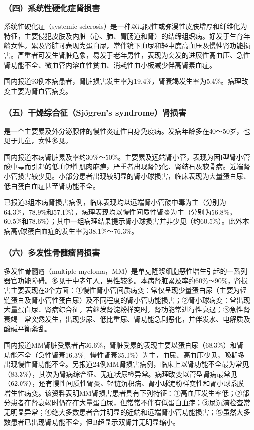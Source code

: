 \subsubsection{（四）系统性硬化症肾损害}

系统性硬化症（systemic
sclerosis）是一种以局限性或弥漫性皮肤增厚和纤维化为特征，主要侵犯皮肤及内脏（心、肺、胃肠道和肾）的结缔组织病。好发于生育年龄女性。累及肾脏可表现为蛋白尿，常伴镜下血尿和轻中度高血压及慢性肾功能损害。严重者可发生肾脏危象，易发于老年男性，表现为突发的进展性高血压、急性肾功能不全、微血管内溶血性贫血、消耗性血小板减少伴高肾素血症。

国内报道93例本病患者，肾脏损害发生率为19.4\%，肾衰竭发生率为5.4\%。病理改变主要为肾血管病变。

\subsubsection{（五）干燥综合征（Sjögren's syndrome）肾损害}

是一个主要累及外分泌腺体的慢性炎症性自身免疫病。发病年龄多在40～50岁，也见于儿童，女性多见。

国内报道本病肾脏累及率约30\%～50\%。主要累及远端肾小管，表现为因Ⅰ型肾小管酸中毒而引起的低血钾性肌肉麻痹，严重者出现肾钙化、肾结石及软骨病。近端肾小管损害较少见。小部分患者出现较明显的肾小球损害，临床表现为大量蛋白尿、低白蛋白血症甚至肾功能不全。

已报道3组本病肾损害病例，临床表现均以远端肾小管酸中毒为主（分别为64.3\%，78.9\%和57.1\%），病理表现均以慢性间质性肾炎为主（分别为56.8\%，60.5\%和78.6\%）；其中一组病理结果提示肾小球损害并非少见（约60.5\%）。此外本病高γ球蛋白血症的发生率为38.1\%～76.3\%。

\subsubsection{（六）多发性骨髓瘤肾损害}

多发性骨髓瘤（multiple
myeloma，MM）是单克隆浆细胞恶性增生引起的一系列器官功能障碍。多见于中老年人，男性较多。本病肾脏累及率约60\%～90\%，肾损害主要表现在3个方面：①慢性肾小管间质病变：常仅呈现少量蛋白尿（主要为轻链蛋白及肾小管性蛋白尿）及不同程度的肾小管功能损害；②肾小球病变：常出现大量蛋白尿、肾病综合征，若继发肾淀粉样变时，肾功能常进行性衰退；③急性肾衰竭：常突然发生，出现少尿、低比重尿、肾功能急剧恶化，并伴发水、电解质及酸碱平衡紊乱。

国内报道MM肾脏受累者占36.6\%，肾脏受累的表现主要以蛋白尿（68.3\%）和肾功能不全（急性肾衰16.3\%，慢性肾衰35.0\%）为主，血尿、高血压少见，晚期多出现慢性肾功能不全。另报道24例MM肾损害病例，临床上以肾功能不全最为常见（83.3\%），其次为肾病综合征、无症状尿检异常。病理改变以管型肾病最常见（62.0\%），还有慢性间质性肾炎、轻链沉积病、肾小球淀粉样变性和肾小球系膜增生性病变。该资料表明MM肾损害患者具有下列特征：①高血压发生率低；②部分患者在肾衰竭时仍存在大量蛋白尿，但常常不伴有低蛋白血症；③尿沉渣检查常无明显异常；④绝大多数患者合并明显的近端和远端肾小管功能损害；⑤虽然大多数患者已出现肾功能不全，但B超显示双肾并无明显缩小。

